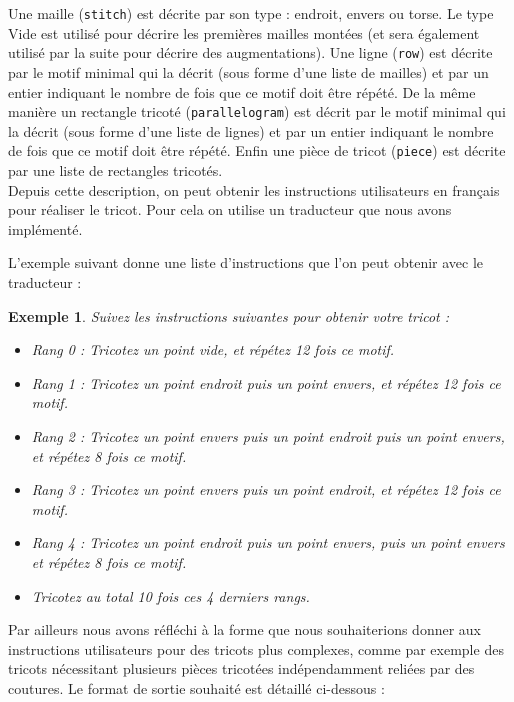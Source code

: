 \documentclass{article}
\newtheorem{ex}{Exemple}
\begin{document}
Une maille (\texttt{stitch}) est décrite par son type : endroit, envers ou torse. Le type Vide est utilisé pour décrire les premières mailles montées (et sera également utilisé par la suite pour décrire des augmentations). Une ligne (\texttt{row}) est décrite par le motif minimal qui la décrit (sous forme d'une liste de mailles) et par un entier indiquant le nombre de fois que ce motif doit être répété. De la même manière un rectangle tricoté (\texttt{parallelogram}) est décrit par le motif minimal qui la décrit (sous forme d'une liste de lignes) et par un entier indiquant le nombre de fois que ce motif doit être répété. Enfin une pièce de tricot (\texttt{piece}) est décrite par une liste de rectangles tricotés. \\

Depuis cette description, on peut obtenir les instructions utilisateurs en français pour réaliser le tricot. Pour cela on utilise un traducteur que nous avons implémenté.

L'exemple suivant donne une liste d'instructions que l'on peut obtenir avec le traducteur :

\begin{ex}
  Suivez les instructions suivantes pour obtenir votre tricot : 
  
  \begin{itemize}
  \item Rang 0 : Tricotez un point vide, et répétez 12 fois ce motif. 
  \item Rang 1 : Tricotez un point endroit puis un point envers, et répétez 12 fois ce motif. 
  \item Rang 2 : Tricotez un point envers puis un point endroit puis un point envers, et répétez 8 fois ce motif. 
  \item Rang 3 : Tricotez un point envers puis un point endroit, et répétez 12 fois ce motif. 
  \item Rang 4 : Tricotez un point endroit puis un point envers, puis un point envers et répétez 8 fois ce motif. 
  \item Tricotez au total 10 fois ces 4 derniers rangs.
  \end{itemize}
\end{ex}

Par ailleurs nous avons réfléchi à la forme que nous souhaiterions donner aux instructions utilisateurs pour des tricots plus complexes, comme par exemple des tricots nécessitant plusieurs pièces tricotées indépendamment reliées par des coutures. Le format de sortie souhaité est détaillé ci-dessous :
\end{document}
